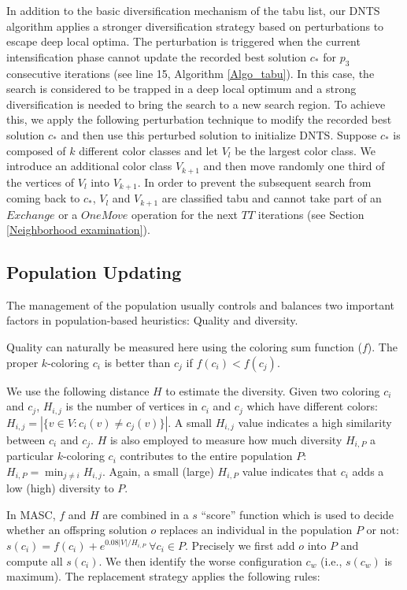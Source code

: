 \documentclass{elsart}
\begin{document}
In addition to the basic diversification mechanism of the tabu list, our DNTS algorithm applies a stronger diversification strategy based on perturbations to escape deep local optima. The perturbation is triggered when the current intensification phase cannot update the recorded best solution $c_*$ for $p_3$ consecutive iterations (see line 15, Algorithm \ref{Algo_tabu}). In this case, the search is considered to be trapped in a deep local optimum and a strong diversification is needed to bring the search to a new search region. To achieve this, we apply the following perturbation technique to modify the recorded best solution $c_*$ and then use this perturbed solution to initialize DNTS. Suppose $c_*$ is composed of $k$ different color classes and let $V_l$ be the largest color class. We introduce an additional color class  $V_{k + 1}$ and then move randomly one third of the vertices of $V_l$ into $V_{k + 1}$. In order to prevent the subsequent search from coming back to $c_*$, $V_l$ and $V_{k + 1}$ are classified tabu and cannot take part of an $Exchange$ or a $OneMove$ operation for the next $TT$ iterations (see Section \ref{Neighborhood examination}).




\subsection{Population Updating}
\label{subsec_sol_population_update}

The management of the population usually controls and balances two important factors in population-based heuristics: Quality and diversity.

Quality can naturally be measured here using the coloring sum function ($f$). The proper $k$-coloring $c_i$ is better than $c_j$ if $f(c_i) < f(c_j)$.

We use the following distance $H$ to estimate the diversity. Given two coloring $c_i$ and $c_j$, $H_{i, j}$ is the number of vertices in $c_i$ and $c_j$ which have different colors: $H_{i, j} = |\{v \in V: c_i(v) \neq c_j(v)\}|$. A small $H_{i, j}$ value indicates a high similarity between $c_i$ and $c_j$. $H$ is also employed to measure how much diversity $H_{i, P}$ a particular $k$-coloring $c_i$ contributes to the entire population $P$: $H_{i, P} = \min_{j \neq i} H_{i, j}$. Again, a small (large) $H_{i, P}$ value indicates that $c_i$ adds a low (high) diversity to $P$.

In MASC, $f$ and $H$ are combined in a $s$ ``score'' function which is used to decide whether an offspring solution $o$ replaces an individual in the population $P$ or not: $s(c_i)=f(c_i)+e^{0.08|V|/H_{i,P}}~\forall c_i \in P$. Precisely we first add $o$ into $P$ and compute all $s(c_i)$. We then identify the worse configuration $c_w$ (i.e., $s(c_w)$ is maximum). The replacement strategy applies the following rules:
\end{document}
